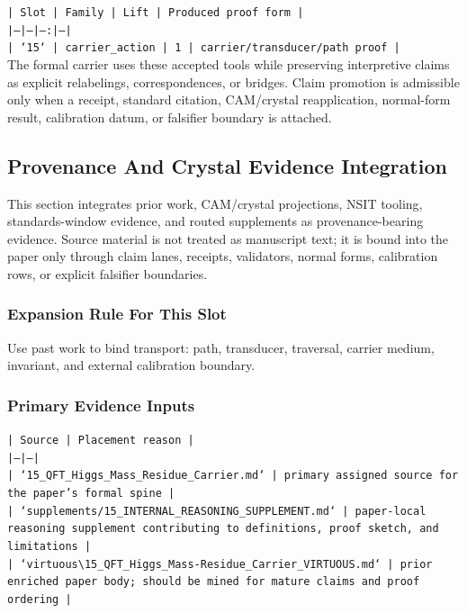 \documentclass[11pt]{article}
\begin{document}
\noindent\texttt{| Slot | Family | Lift | Produced proof form |}\\
\noindent\texttt{|---|---|---:|---|}\\
\noindent\texttt{| `15` | carrier\_action | 1 | carrier/transducer/path proof |}\\

The formal carrier uses these accepted tools while preserving interpretive
claims as explicit relabelings, correspondences, or bridges. Claim promotion is admissible only when a receipt, standard citation,
CAM/crystal reapplication, normal-form result, calibration datum, or falsifier
boundary is attached.

\subsection*{Provenance And Crystal Evidence Integration}

This section integrates prior work, CAM/crystal projections, NSIT tooling,
standards-window evidence, and routed supplements as provenance-bearing
evidence. Source material is not treated as manuscript text; it is bound into
the paper only through claim lanes, receipts, validators, normal forms,
calibration rows, or explicit falsifier boundaries.

\subsubsection*{Expansion Rule For This Slot}

Use past work to bind transport: path, transducer, traversal, carrier medium, invariant, and external calibration boundary.

\subsubsection*{Primary Evidence Inputs}

\noindent\texttt{| Source | Placement reason |}\\
\noindent\texttt{|---|---|}\\
\noindent\texttt{| `15\_QFT\_Higgs\_Mass\_Residue\_Carrier.md` | primary assigned source for the paper's formal spine |}\\
\noindent\texttt{| `supplements/15\_INTERNAL\_REASONING\_SUPPLEMENT.md` | paper-local reasoning supplement contributing to definitions, proof sketch, and limitations |}\\
\noindent\texttt{| `virtuous\textbackslash{}15\_QFT\_Higgs\_Mass-Residue\_Carrier\_VIRTUOUS.md` | prior enriched paper body; should be mined for mature claims and proof ordering |}\\
\end{document}
